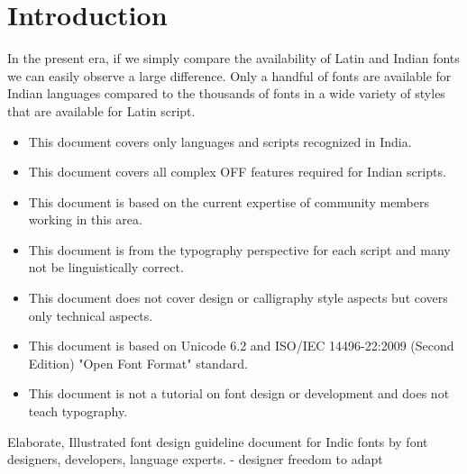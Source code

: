 \chapter{Introduction}



In the present era, if we simply compare the availability of Latin and Indian fonts we can easily observe a large difference. Only a handful of fonts are available for Indian languages compared to the thousands of fonts in a wide  variety of styles that are available for Latin script.



\begin{itemize}
\item This document covers only languages and scripts recognized in India.
\item This document covers all complex OFF features required for Indian scripts.
\item This document is based on the current expertise of community members working in this area.
\item This document is from the typography perspective for each script and many not be linguistically correct.
\item This document does not cover design or calligraphy style aspects but covers only technical aspects.
\item This document is based on Unicode 6.2 and ISO/IEC 14496-22:2009 (Second Edition) "Open Font Format" standard.
\item This document is not a tutorial on font design or development and does not teach typography.
\end{itemize}


Elaborate, Illustrated font design guideline document for Indic fonts by font designers, developers, language experts.
- designer freedom to adapt

